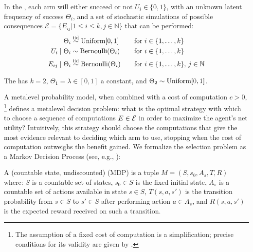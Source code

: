 \begin{example}\label{example:bernoulli}
In the ,
each arm will either succeed or not $U_i\in\{0,1\}$, with an unknown latent frequency of success $\Theta_i$, 
and a set of stochastic simulations of possible consequences
$\mathcal{E} = \{E_{ij} | 1\le i \le k, j\in \mathbb{N}\}$ that can be performed:
\begin{align*}
	\Theta_i &\stackrel{\rm iid}{\sim} {\rm Uniform}[0,1]                      &&\quad\text{for $i\in\{1,\dots,k\}$}\\
	U_i \mid \Theta_i &\sim {\rm Bernoulli}(\Theta_i) &&\quad\text{for $i\in\{1,\dots,k\}$}\\
	E_{ij} \mid \Theta_i &\stackrel{\rm iid}{\sim} {\rm Bernoulli}(\Theta_i) &&\quad\text{for $i\in\{1,\dots,k\}$, $j\in\mathbb{N}$}
\end{align*}

The  has $k=2$,
$\Theta_1=\lambda\in[0,1]$ a constant, and $\Theta_2\sim{\rm Uniform}[0,1]$.
\end{example}

A metalevel probability model, when combined with a cost of computation $c>0$,%
\footnote{The assumption of a fixed cost of computation is a simplification; 
	precise conditions for its validity are given by \citet{Harada:1997}.} 
defines a metalevel decision problem: what is the optimal strategy with which to choose a sequence 
of computations $E\in\mathcal{E}$ in order to maximize the agent's net utility?
Intuitively, this strategy should choose the computations that give the most evidence relevant
to deciding which arm to use, stopping when the cost of computation 
outweighs the benefit gained. We formalize the selection problem as a Markov Decision Process
(see, e.g., \citet{Puterman:1994}):

\begin{dfn}
A (countable state, undiscounted)  (MDP) is a tuple $M=(S,s_0,A_s,T,R)$ where:
	$S$ is a countable set of states,
	$s_0\in S$ is the fixed initial state,
	$A_s$ is a countable set of actions available in state $s\in S$,
	$T(s,a,s')$ is the transition probability from $s\in S$ to $s'\in S$ after performing action $a\in A_s$,
	and $R(s,a,s')$ is the expected reward received on such a transition.
\end{dfn}

